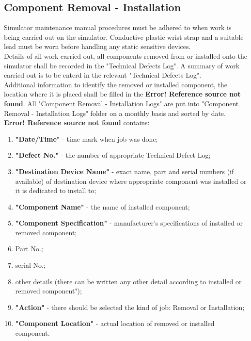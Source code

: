     \subsection{Component Removal - Installation}
        Simulator maintenance manual procedures must be adhered to when work is being carried out on the simulator. Conductive plastic wrist strap and a suitable lead 
        must be worn before handling any static sensitive devices. \\
        \vspace{3mm}
        Details of all work carried out, all components removed from or installed onto the simulator shall be recorded in the "Technical Defects Log". A summary of work 
        carried out is to be enterd in the relevant "Technical Defects Log". \\
        \vspace{3mm}
        Additional information to identify the removed or installed component, the location where it is placed shall be filled in the \textbf{Error! Reference source not 
        found}. All "Component Removal - Installation Logs" are put into "Component Removal - Installation Logs" folder on a monthly basis and sorted by date. \\
        \vspace{3mm}
        \textbf{Error! Reference source not found} contains:
        \begin{enumerate}
            \item \textbf{"Date/Time"} - time mark when job was done;
            \item \textbf{"Defect No."} - the number of appropriate Technical Defect Log;
            \item \textbf{"Destination Device Name"} - exact name, part and serial numbers (if available) of destination device where appropriate component was 
            installed or it is dedicated to install to;
            \item \textbf{"Component Name"} - the name of installed component;
            \item \textbf{"Component Specification"} - manufacturer's specifications of installed or removed component;
            \item Part No.;
            \item serial No.;
            \item other details (there can be written any other detail according to installed or removed component");
            \item \textbf{"Action"} - there should be selected the kind of job: Removal or Installation;
            \item \textbf{"Component Location"} - actual location of removed or installed component.
        \end{enumerate}

